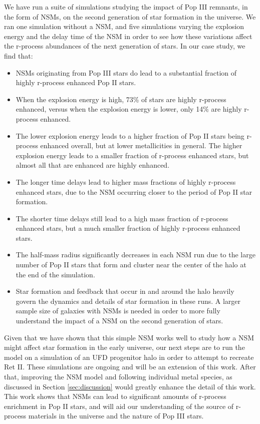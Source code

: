 \documentclass[fleqn,usenatbib]{mnras}
\begin{document}
We have run a suite of simulations studying the impact of Pop III remnants, in the form of NSMs, on the second generation of star formation in the universe. We ran one simulation without a NSM, and five simulations varying the explosion energy and the delay time of the NSM in order to see how these variations affect the r-process abundances of the next generation of stars. In our case study, we find that:
\begin{itemize}
	\item NSMs originating from Pop III stars do lead to a substantial fraction of highly r-process enhanced Pop II stars.
	\item When the explosion energy is high, 73\% of stars are highly r-process enhanced, versus when the explosion energy is lower, only 14\% are highly r-process enhanced. 
	\item The lower explosion energy leads to a higher fraction of Pop II stars being r-process enhanced overall, but at lower metallicities in general. The higher explosion energy leads to a smaller fraction of r-process enhanced stars, but almost all that are enhanced are highly enhanced. 
	\item The longer time delays lead to higher mass fractions of highly r-process enhanced stars, due to the NSM occurring closer to the period of Pop II star formation. 
	\item The shorter time delays still lead to a high mass fraction of r-process enhanced stars, but a much smaller fraction of highly r-process enhanced stars.
	\item The half-mass radius significantly decreases in each NSM run due to the large number of Pop II stars that form and cluster near the center of the halo at the end of the simulation. 
	\item Star formation and feedback that occur in and around the halo heavily govern the dynamics and details of star formation in these runs. A larger sample size of galaxies with NSMs is needed in order to more fully understand the impact of a NSM on the second generation of stars. 
\end{itemize}

Given that we have shown that this simple NSM works well to study how a NSM might affect star formation in the early universe, our next steps are to run the model on a simulation of an UFD progenitor halo in order to attempt to recreate Ret II. These simulations are ongoing and will be an extension of this work. After that, improving the NSM model and following individual metal species, as discussed in Section \ref{sec:discussion} would greatly enhance the detail of this work. This work shows that NSMs can lead to significant amounts of r-process enrichment in Pop II stars, and will aid our understanding of the source of r-process materials in the universe and the nature of Pop III stars.
\end{document}
